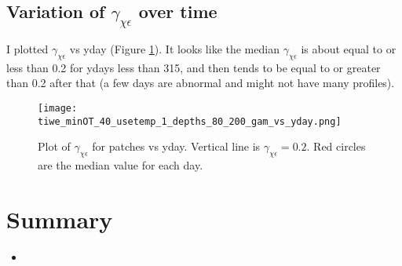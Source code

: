 \documentclass[11pt]{article}
\begin{document}
%
\clearpage
\subsection{Variation of $\gamma_{\chi\epsilon}$ over time}

I plotted $\gamma_{\chi\epsilon}$ vs yday (Figure \ref{gamvsyday}). It looks like the median $\gamma_{\chi\epsilon}$ is about equal to or less than 0.2 for ydays less than 315, and then tends to be equal to or greater than 0.2 after that (a few days are abnormal and might not have many profiles).

\begin{figure}[htbp]
\texttt{[image: tiwe\_minOT\_40\_usetemp\_1\_depths\_80\_200\_gam\_vs\_yday.png]}
\caption{Plot of $\gamma_{\chi\epsilon}$ for patches vs yday. Vertical line is $\gamma_{\chi\epsilon}=0.2$. Red circles are the median value for each day.}
\label{gamvsyday}
\end{figure}





%
\clearpage
\section{Summary}

\begin{itemize}
\item 
\end{itemize}





\end{document}
